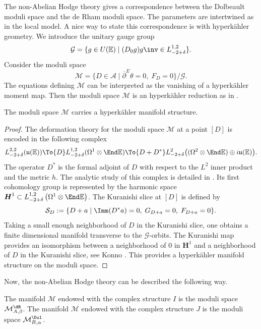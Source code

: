 The non-Abelian Hodge theory gives a correspondence between the Dolbeault moduli space and the de Rham moduli space. The parameters are intertwined as in the local model. A nice way to state this correspondence is with hyperkähler geometry. We introduce the unitary gauge group
\[
\mathcal{G}=\lbrace g\in U(\mathbb{E}) \mid(D_0 g) g\inv \in L^{1,2}_{-2+\delta}\rbrace.
\]
Consider the moduli space
\[
\mathcal{M}=\lbrace D\in\mathcal{A} \mid \overline{\partial}^E \theta=0, \; F_D=0\rbrace/\mathcal{G}.
\]
The equations defining $\mathcal{M}$ can be interpreted as the vanishing of a hyperkähler moment map. Then the moduli space $\mathcal{M}$ is an hyperkähler reduction as in \cite{Hitchin_Karlhede_Lindstrom_Rocek}.
\begin{theorem}
The moduli space $\mathcal{M}$ carries a hyperkähler manifold structure.
\end{theorem}
\begin{proof}
The deformation theory for the moduli space $\mathcal{M}$ at a point $[D]$ is encoded in the following complex
\[
L^{2,2}_{-2+\delta}(\mathfrak{u}(\mathbb{E})) \To{D} L^{1,2}_{-2+\delta}(\Omega^1\otimes\End \mathbb{E}) \To{D+D^*} L^{2}_{-2 +\delta} \bigl((\Omega^2\otimes \End \mathbb{E})\oplus i\mathfrak{u}(\mathbb{E})\bigr).
\]
The operator $D^*$ is the formal adjoint of $D$ with respect to the $L^2$ inner product and the metric $h$. The analytic study of this complex is detailed in \cite{Biquard_Boalch_2004}. Its first cohomology group is represented by the harmonic space $\boldsymbol{H}^1 \subset L^{1,2}_{-2+\delta} \left(\Omega^1\otimes\End \mathbb{E}\right) $. The Kuranishi slice at $[D]$ is defined by
\begin{equation}\label{eq_kuranishi_slice}
\mathcal{S}_D :=\lbrace D+a \mid \Imm(D^* a)= 0, \; G_{D+a}=0, \; F_{D+a}=0\rbrace.
\end{equation}
Taking a small enough neighborhood of $D$ in the Kuranishi slice, one obtains a finite dimensional manifold transverse to the $\mathcal{G}$-orbits. The Kuranishi map provides an isomorphism between a neighborhood of $0$ in $\boldsymbol{H}^1$ and a neighborhood of $D$ in the Kuranishi slice, see Konno \cite[Lem.\,3.8, Th.\,3.9]{Konno}. This provides a hyperkähler manifold structure on the moduli space.
\end{proof}

Now, the non-Abelian Hodge theory can be described the following way.
\begin{theorem}
The manifold $\mathcal{M}$ endowed with the complex structure $I$ is the moduli space $\mathcal{M}^{\dR}_{A,\beta}$. The manifold $\mathcal{M}$ endowed with the complex structure $J$ is the moduli space $\mathcal{M}^{\Dol}_{B,\alpha}$.
\end{theorem}

